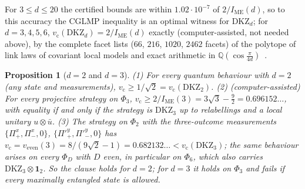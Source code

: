 \documentclass[11pt]{article}
\newtheorem{proposition}[lemma]{Proposition}
\theoremstyle{remark}
\numberwithin{equation}{section}
\newcommand{\IME}{I_{\mathrm{ME}}}
\newcommand{\one}{\mathbf{1}}
\newcommand{\vc}{v_{\mathrm c}}
\newcommand{\veven}{v_{\mathrm{even}}}
\newcommand{\DKZ}{\mathrm{DKZ}}
\begin{document}
For $3\le d\le20$ the certified bounds are within $1.02\cdot10^{-7}$ of $2/\IME(d)$, so to this accuracy the CGLMP
inequality is an optimal witness for $\DKZ_d$; for $d=3,4,5,6$, $\vc(\DKZ_d)=2/\IME(d)$ exactly (computer-assisted, not
needed above), by the complete facet lists ($66$, $216$, $1020$, $2462$ facets) of the polytope of link laws of covariant
local models and exact arithmetic in $\mathbb Q(\cos\frac\pi{4d})$~\cite[Remark~9.10]{MSmath}.

\begin{proposition}[$d=2$ and $d=3$]\label{prop:small}
\textup{(1)} For every quantum behaviour with $d=2$ \textup{(}any state and measurements\textup{)}, $\vc\ge1/\sqrt2=\vc(\DKZ_2)$.
\textup{(2)} \textup{(computer-assisted)} For every projective strategy on $\Phi_3$, $\vc\ge2/\IME(3)=3\sqrt3-\frac92=0.696152\ldots$,
with equality if and only if the strategy is $\DKZ_3$ up to relabellings and a local unitary $u\otimes\bar u$.
\textup{(3)} The strategy on $\Phi_2$ with the three-outcome measurements $\{\Pi^x_+,\Pi^x_-,0\}$, $\{\Pi'^y_+,\Pi'^y_-,0\}$
has $\vc=\veven(3)=8/(9\sqrt2-1)=0.682132\ldots<\vc(\DKZ_3)$; the same behaviour arises on every $\Phi_D$ with $D$ even,
in particular on $\Phi_6$, which also carries $\DKZ_3\otimes\one_2$.
So the clause holds for $d=2$; for $d=3$ it holds on $\Phi_3$ and fails if every maximally entangled state is allowed.
\end{proposition}
\end{document}
